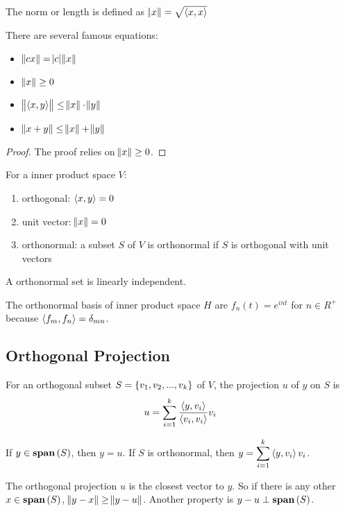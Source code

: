 The norm or length is defined as $\norm{x} = \sqrt{\left\langle \displaystyle x, x \right\rangle}$

There are several famous equations:
\begin{itemize}
    \item $\norm{cx} = \abs{c} \norm{x}$
    \item $\norm{x} \geq 0$
    \item $\norm{\left\langle \displaystyle x, y \right\rangle} \leq \norm{x} \cdot \norm{y}$
    \item $\norm{x+y} \leq \norm{x} + \norm{y}$
\end{itemize}
\begin{proof}
    The proof relies on $\norm{x} \geq 0$.
\end{proof}


\begin{definition}
    For a inner product space $V$:
    \begin{enumerate}
        \item orthogonal: $\left\langle \displaystyle x, y \right\rangle = 0$
        \item unit vector: $\norm{x} =0$
        \item orthonormal: a subset $S$ of $V$ is orthonormal if $S$ is orthogonal with unit vectors
    \end{enumerate}
\end{definition}

A orthonormal set is linearly independent.

The orthonormal basis of inner product space $H$ are $f_n(t) = e^{int}$ for $n \in R^+$ because $\left\langle \displaystyle f_m, f_n \right\rangle = \delta_{mn} $.




\subsection{Orthogonal Projection}

For an orthogonal subset $S=\set{v_1, v_2, ..., v_k}$ of $V$, the projection $u$ of $y$ on $S$ is 
\begin{equation}
    u = \sum_{i=1}^k \frac{\left\langle \displaystyle y, v_i \right\rangle}{\left\langle \displaystyle v_i, v_i \right\rangle} v_i
\end{equation}

If $y \in \displaystyle \mathbf{span}\left( S \right)$, then $\displaystyle y = u$. If $S$ is orthonormal, then $\displaystyle y = \sum_{i=1}^k \left\langle \displaystyle y, v_i \right\rangle v_i$. 

The orthogonal projection $u$ is the closest vector to $y$. So if there is any other $x \in \displaystyle \mathbf{span}\left( S \right)$, $\norm{y - x} \geq \norm{y - u}$. Another property is $y - u \perp \displaystyle \mathbf{span}\left( S \right)$.



